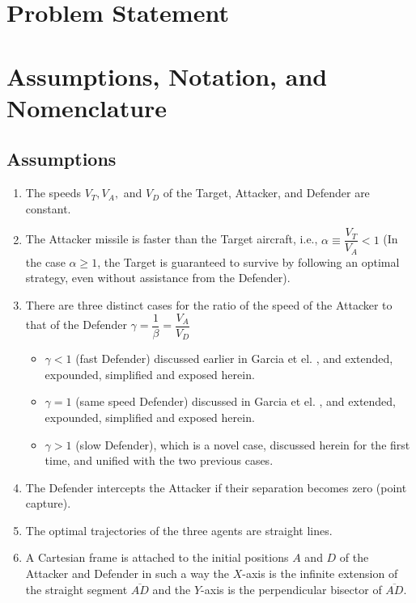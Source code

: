 \section{Problem Statement}


\section{Assumptions, Notation, and Nomenclature}
\subsection*{Assumptions}
\begin{enumerate}
\item The speeds $V_{T},V_{A},$ and $V_{D}$ of the Target, Attacker, and Defender are constant.
\item The Attacker missile is faster than the Target aircraft, i.e., $\alpha\equiv \dfrac{V_{T}}{V_{A}}<1$ (In the case $\alpha\geq1$, the Target is guaranteed to survive by following an optimal strategy, even without assistance from the Defender).
\item There are three distinct cases for the ratio of the speed of the Attacker to that of the Defender $\gamma=\dfrac{1}{\beta}=\dfrac{V_{A}}{V_{D}}$ 
\begin{itemize}
\item $\gamma<1$ (fast Defender) discussed earlier in Garcia et el. \cite{garcia2015active}, and extended, expounded, simplified and exposed herein.
\item $\gamma =1$ (same speed Defender) discussed in Garcia et el. \cite{pachter2014active,garcia2015escape}, and extended, expounded, simplified and exposed herein.
\item $\gamma>1$ (slow Defender), which is a novel case, discussed herein for the first time, and unified with the two previous cases.  
\end{itemize}

\item The Defender intercepts the Attacker if their separation becomes zero (point capture).
\item The optimal trajectories of the three agents are straight lines.
\item A Cartesian frame is attached to the initial positions $A$ and $D$ of the Attacker and Defender in such a way the $X$-axis is the infinite extension of the straight segment $\overline{AD}$ and the $Y$-axis is the perpendicular bisector of $\overline{AD}$.
\end{enumerate}

